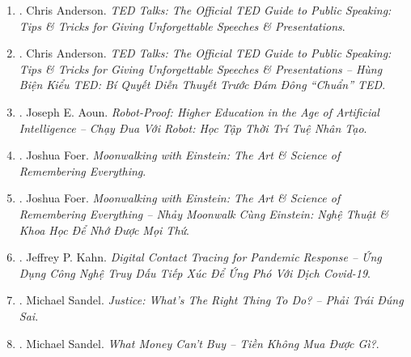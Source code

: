\documentclass{article}
\begin{document}
\begin{enumerate}
	\item \cite{Anderson2016}. Chris Anderson. \textit{TED Talks: The Official TED Guide to Public Speaking: Tips \& Tricks for Giving Unforgettable Speeches \& Presentations}.\hfill{\sf[reading]}
	\item \cite{Anderson2022}. Chris Anderson. \textit{TED Talks: The Official TED Guide to Public Speaking: Tips \& Tricks for Giving Unforgettable Speeches \& Presentations -- Hùng Biện Kiểu TED: Bí Quyết Diễn Thuyết Trước Đám Đông ``Chuẩn'' TED}.\hfill{\sf[finished]}
	\item \cite{Aoun2019}. Joseph E. Aoun. \textit{Robot-Proof: Higher Education in the Age of Artificial Intelligence -- Chạy Đua Với Robot: Học Tập Thời Trí Tuệ Nhân Tạo}.\hfill{\sf[finished]}
	\item \cite{Foer2012}. Joshua Foer. \textit{Moonwalking with Einstein: The Art \& Science of Remembering Everything}.\hfill{\sf[reading]}
	\item \cite{Foer_remember}. Joshua Foer. \textit{Moonwalking with Einstein: The Art \& Science of Remembering Everything -- Nhảy Moonwalk Cùng Einstein: Nghệ Thuật \& Khoa Học Để Nhớ Được Mọi Thứ}.\hfill{\sf[reading]}
	\item \cite{Kahn2020}. Jeffrey P. Kahn. \textit{Digital Contact Tracing for Pandemic Response -- Ứng Dụng Công Nghệ Truy Dấu Tiếp Xúc Để Ứng Phó Với Dịch Covid-19}.\hfill{\sf[finished]}
	\item \cite{Sandel_justice}. Michael Sandel. \textit{Justice: What's The Right Thing To Do? -- Phải Trái Đúng Sai}.\hfill{\sf[reading]}
	\item \cite{Sandel_money}. Michael Sandel. \textit{What Money Can't Buy -- Tiền Không Mua Được Gì?}.\hfill{\sf[finished]}
\end{enumerate}


\printbibliography[heading=bibintoc]
	
\end{document}
